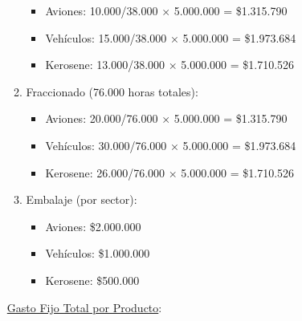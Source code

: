 \documentclass[10pt,a4paper]{article}
\begin{document}
\begin{enumerate}[label=\textbf{\sffamily\large\arabic*.}]
\begin{enumerate}[label=\alph*)]
        \begin{itemize}

            \item Aviones: 10.000/38.000 × 5.000.000 = \$1.315.790
            \item Vehículos: 15.000/38.000 × 5.000.000 = \$1.973.684
            \item Kerosene: 13.000/38.000 × 5.000.000 = \$1.710.526 \\
    
        \end{itemize}

        \item Fraccionado (76.000 horas totales):
        
        \begin{itemize}

            \item Aviones: 20.000/76.000 × 5.000.000 = \$1.315.790
            \item Vehículos: 30.000/76.000 × 5.000.000 = \$1.973.684
            \item Kerosene: 26.000/76.000 × 5.000.000 = \$1.710.526 \\
    
        \end{itemize}

        \item Embalaje (por sector):
        
        \begin{itemize}

            \item Aviones: \$2.000.000
            \item Vehículos: \$1.000.000
            \item Kerosene: \$500.000\\
    
        \end{itemize}

    \end{enumerate}

    \vspace{0.5em}

    \underline{Gasto Fijo Total por Producto}: \\


\end{enumerate}
\end{document}
